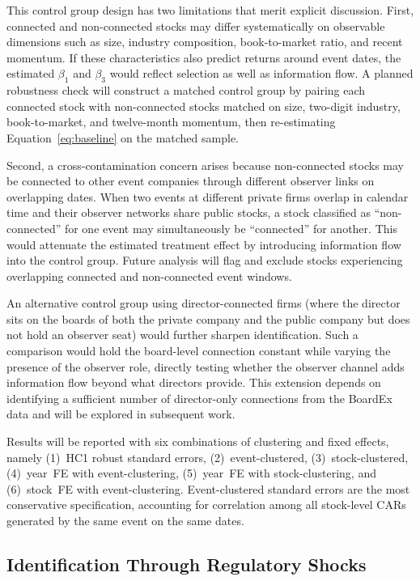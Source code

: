 This control group design has two limitations that merit explicit discussion. First, connected and non-connected stocks may differ systematically on observable dimensions such as size, industry composition, book-to-market ratio, and recent momentum. If these characteristics also predict returns around event dates, the estimated $\beta_1$ and $\beta_3$ would reflect selection as well as information flow. A planned robustness check will construct a matched control group by pairing each connected stock with non-connected stocks matched on size, two-digit industry, book-to-market, and twelve-month momentum, then re-estimating Equation~\ref{eq:baseline} on the matched sample.

Second, a cross-contamination concern arises because non-connected stocks may be connected to other event companies through different observer links on overlapping dates. When two events at different private firms overlap in calendar time and their observer networks share public stocks, a stock classified as ``non-connected'' for one event may simultaneously be ``connected'' for another. This would attenuate the estimated treatment effect by introducing information flow into the control group. Future analysis will flag and exclude stocks experiencing overlapping connected and non-connected event windows.

An alternative control group using director-connected firms (where the director sits on the boards of both the private company and the public company but does not hold an observer seat) would further sharpen identification. Such a comparison would hold the board-level connection constant while varying the presence of the observer role, directly testing whether the observer channel adds information flow beyond what directors provide. This extension depends on identifying a sufficient number of director-only connections from the BoardEx data and will be explored in subsequent work.

Results will be reported with six combinations of clustering and fixed effects, namely (1)~HC1 robust standard errors, (2)~event-clustered, (3)~stock-clustered, (4)~year~FE with event-clustering, (5)~year~FE with stock-clustering, and (6)~stock~FE with event-clustering. Event-clustered standard errors are the most conservative specification, accounting for correlation among all stock-level CARs generated by the same event on the same dates.

\subsection{Identification Through Regulatory Shocks}

